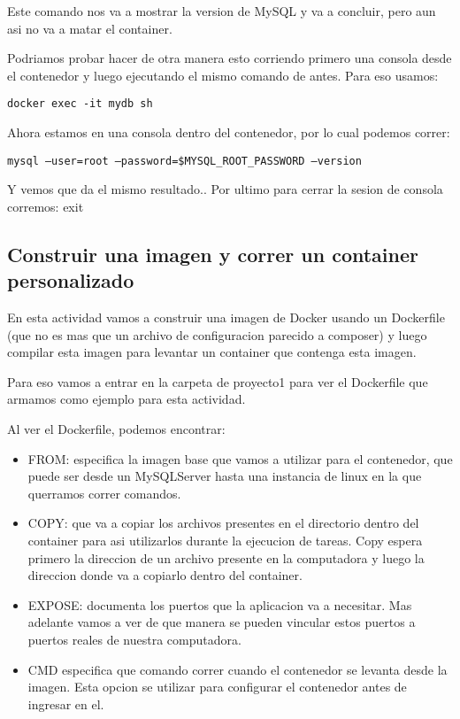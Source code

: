 \documentclass[11pt]{article} %
\begin{document}
Este comando nos va a mostrar la version de MySQL y va a concluir, pero aun asi no va a matar el container. 

Podriamos probar hacer de otra manera esto corriendo primero una consola desde el contenedor y luego ejecutando el mismo comando de antes. Para eso usamos:
\begin{center}
	\texttt{docker exec -it mydb sh}
\end{center}

Ahora estamos en una consola dentro del contenedor, por lo cual podemos correr:
\begin{center}
	\texttt{mysql --user=root --password=\$MYSQL\_ROOT\_PASSWORD --version}
\end{center}

Y vemos que da el mismo resultado.. Por ultimo para cerrar la sesion de consola corremos: exit


\subsection{Construir una imagen y correr un container personalizado}

En esta actividad vamos a construir una imagen de Docker usando un Dockerfile (que no es mas que un archivo de configuracion parecido a composer) y luego compilar esta imagen para levantar un container que contenga esta imagen. 

Para eso vamos a entrar en la carpeta de proyecto1 para ver el Dockerfile que armamos como ejemplo para esta actividad.

Al ver el Dockerfile, podemos encontrar:
\begin{itemize}
	\item
	FROM: especifica la imagen base que vamos a utilizar para el contenedor, que puede ser desde un MySQLServer hasta una instancia de linux en la que querramos correr comandos.

	\item
	COPY: que va a copiar los archivos presentes en el directorio dentro del container para asi utilizarlos durante la ejecucion de tareas.
	Copy espera primero la direccion de un archivo presente en la computadora y luego la direccion donde va a copiarlo dentro del container.
	
	\item	
	EXPOSE: documenta los puertos que la aplicacion va a necesitar. Mas adelante vamos a ver de que manera se pueden vincular estos puertos a puertos reales de nuestra computadora.
	
	\item
	CMD especifica que comando correr cuando el contenedor se levanta desde la imagen. Esta opcion se utilizar para configurar el contenedor antes de ingresar en el.
\end{itemize}
\end{document}
